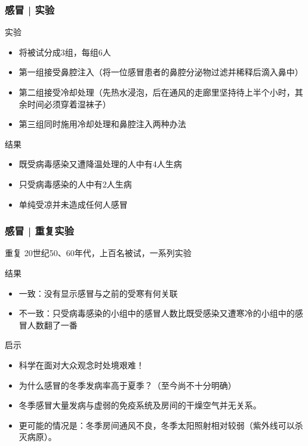 \begin{frame}
  \frametitle{感冒 | 实验}
  \begin{block}{实验}
    \begin{itemize}
      \item 将被试分成3组，每组6人
      \item 第一组接受鼻腔注入（将一位感冒患者的鼻腔分泌物过滤并稀释后滴入鼻中）
      \item 第二组接受冷却处理（先热水浸泡，后在通风的走廊里坚持待上半个小时，其余时间必须穿着湿袜子）
      \item 第三组同时施用冷却处理和鼻腔注入两种办法
    \end{itemize}
  \end{block}
  \pause
  \begin{block}{结果}
    \begin{itemize}
      \item 既受病毒感染又遭降温处理的人中有4人生病
      \item 只受病毒感染的人中有2人生病
      \item 单纯受凉并未造成任何人感冒
    \end{itemize}
  \end{block}
\end{frame}

\begin{frame}
  \frametitle{感冒 | 重复实验}
  \begin{block}{重复}
      20世纪50、60年代，上百名被试，一系列实验
  \end{block}
  \pause
  \begin{block}{结果}
    \begin{itemize}
      \item 一致：没有显示感冒与之前的受寒有何关联
      \item 不一致：只受病毒感染的小组中的感冒人数比既受感染又遭寒冷的小组中的感冒人数翻了一番
    \end{itemize}
  \end{block}
  \pause
  \begin{block}{启示}
    \begin{itemize}
      \item \alert{科学在面对大众观念时处境艰难！}
      \item 为什么感冒的冬季发病率高于夏季？（至今尚不十分明确）
      \item 冬季感冒大量发病与虚弱的免疫系统及房间的干燥空气并无关系。
      \item 更可能的情况是：冬季房间通风不良，冬季太阳照射相对较弱（紫外线可以杀灭病原）。
    \end{itemize}
  \end{block}
\end{frame}

